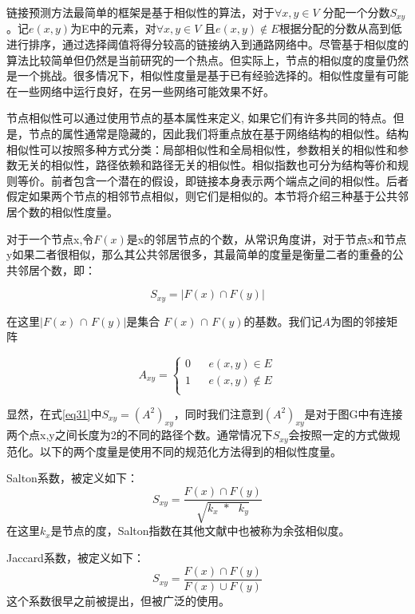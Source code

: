 链接预测方法最简单的框架是基于相似性的算法，对于$\forall x,y\in V$ 分配一个分数$S_{xy}$。记$e(x,y)$为E中的元素，对$\forall x,y\in V$ 且$e(x,y) \notin E$根据分配的分数从高到低进行排序，通过选择阈值将得分较高的链接纳入到通路网络中。尽管基于相似度的算法比较简单但仍然是当前研究的一个热点。但实际上，节点的相似度的度量仍然是一个挑战。很多情况下，相似性度量是基于已有经验选择的。相似性度量有可能在一些网络中运行良好，在另一些网络可能效果不好\cite{Link prediction approach to collaborative filtering, in: Proceedings}。

节点相似性可以通过使用节点的基本属性来定义, 如果它们有许多共同的特点。但是，节点的属性通常是隐藏的，因此我们将重点放在基于网络结构的相似性。结构相似性可以按照多种方式分类：局部相似性和全局相似性，参数相关的相似性和参数无关的相似性，路径依赖和路径无关的相似性。相似指数也可分为结构等价和规则等价。前者包含一个潜在的假设，即链接本身表示两个端点之间的相似性。后者假定如果两个节点的相邻节点相似，则它们是相似的。本节将介绍三种基于公共邻居个数的相似性度量。

对于一个节点x,令$F(x)$是x的邻居节点的个数，从常识角度讲，对于节点x和节点y如果二者很相似，那么其公共邻居很多，其最简单的度量是衡量二者的重叠的公共邻居个数，即：

\begin{equation}
	S_{xy} = |F(x) \cap F(y)|
	\label{eq31}
\end{equation}

在这里$|F(x)$ $\cap$ $F(y)|$是集合  $F(x)$ $\cap$ $F(y)$的基数。我们记$A$为图的邻接矩阵

\begin{equation}
  A_{xy}=\left\{
 \begin{array}{rcl}
 0      &      & {e(x,y) \in E}\\
 1      &      & {e(x,y) \notin E}\\
 \end{array} \right. 
\end{equation}

显然，在式\ref{eq31}中$S_{xy}=(A^2)_{xy}$，同时我们注意到$(A^2)_{xy}$是对于图G中有连接两个点x,y之间长度为2的不同的路径个数。通常情况下$S_{xy}$会按照一定的方式做规范化。以下的两个度量是使用不同的规范化方法得到的相似性度量。

Salton系数，被定义如下：
\begin{equation}
S_{xy} =\frac{F( x) \cap F( y)}{\sqrt{k_{x\ \ } *\ \ \ k_{y}}}
\end{equation}
在这里$k_{x}$是节点的度，Salton指数在其他文献中也被称为余弦相似度。

Jaccard系数，被定义如下：
\begin{equation}
S_{xy} =\frac{F( x) \cap F( y)}{F( x) \cup F( y)}
\end{equation}
这个系数很早之前被提出，但被广泛的使用。

